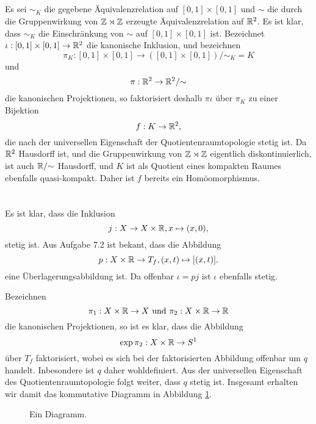 \documentclass[a4paper,10pt]{article}
\begin{document}
\subsection{}
Es sei $\sim_K$ die gegebene Äquivalenzrelation auf $[0,1] \times [0,1]$ und $\sim$ die durch die Gruppenwirkung von $\mathbb{Z} \rtimes \mathbb{Z}$ erzeugte Äquivalenzrelation auf $\mathbb{R}^2$. Es ist klar, dass $\sim_K$ die Einschränkung von $\sim$ auf $[0,1] \times [0,1]$ ist. Bezeichnet $\iota : [0,1] \times [0,1] \to \mathbb{R}^2$ die kanonische Inklusion, und bezeichnen
\[
 \pi_K : [0,1] \times [0,1] \to ([0,1] \times [0,1])/{\sim_K} = K
\]
und
\[
 \pi : \mathbb{R}^2 \to \mathbb{R}^2 / {\sim}
\]
die kanonischen Projektionen, so faktorisiert deshalb $\pi \iota$ über $\pi_K$ zu einer Bijektion
\[
 f : K \to \mathbb{R}^2,
\]
die nach der universellen Eigenschaft der Quotientenraumtopologie stetig ist. Da $\mathbb{R}^2$ Hausdorff ist, und die Gruppenwirkung von $\mathbb{Z} \rtimes \mathbb{Z}$ eigentlich diskontinuierlich, ist auch $\mathbb{R}/{\sim}$ Hausdorff, und $K$ ist als Quotient eines kompakten Raumes ebenfalls quasi-kompakt. Daher ist $f$ bereits ein Homöomorphismus.







\section{}
Es ist klar, dass die Inklusion
\[
 j : X \to X \times \mathbb{R}, x \mapsto (x,0),
\]
stetig ist. Aus Aufgabe 7.2 ist bekant, dass die Abbildung
\[
 p : X \times \mathbb{R} \to T_f, (x,t) \mapsto [(x,t)].
\]
eine Überlagerungsabbildung ist. Da offenbar $\iota = pj$ ist $\iota$ ebenfalls stetig.

Bezeichnen
\[
 \pi_1 : X \times \mathbb{R} \to X \text{ und } \pi_2 : X \times \mathbb{R} \to \mathbb{R}
\]
die kanonischen Projektionen, so ist es klar, dass die Abbildung
\[
 \exp \pi_2 : X \times \mathbb{R} \to S^1
\]
über $T_f$ faktorisiert, wobei es sich bei der faktorisierten Abbildung offenbar um $q$ handelt. Inbesondere ist $q$ daher wohldefiniert. Aus der universellen Eigenschaft des Quotientenraumtopologie folgt weiter, dass $q$ stetig ist. Insgesamt erhalten wir damit das kommutative Diagramm in Abbildung \ref{fig: großes Diagramm}.
\begin{figure}\centering
 \caption{Ein Diagramm.}
 \label{fig: großes Diagramm}
\end{figure}
\end{document}
